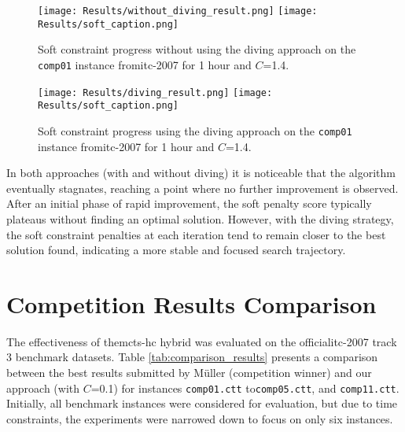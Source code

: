 \begin{figure}
 \centering
    \texttt{[image: Results/without\_diving\_result.png]}
    \texttt{[image: Results/soft\_caption.png]}
    \caption{Soft constraint progress without using the diving approach on the \texttt{comp01} instance from\ac{itc-2007} for 1 hour and \(C\)=1.4.}
    \label{fig:without_diving_result}
\end{figure}

\begin{figure}
 \centering
    \texttt{[image: Results/diving\_result.png]}
    \texttt{[image: Results/soft\_caption.png]}
    \caption{Soft constraint progress using the diving approach on the \texttt{comp01} instance from\ac{itc-2007} for 1 hour and \(C\)=1.4.}
    \label{fig:diving_result}
\end{figure}

In both approaches (with and without diving) it is noticeable that the algorithm eventually stagnates, reaching a point where no further improvement is observed. After an initial phase of rapid improvement, the soft penalty score typically plateaus without finding an optimal solution. However, with the diving strategy, the soft constraint penalties at each iteration tend to remain closer to the best solution found, indicating a more stable and focused search trajectory.

\section{Competition Results Comparison}

The effectiveness of the\ac{mcts}-\ac{hc} hybrid was evaluated on the official\ac{itc-2007} track 3 benchmark datasets. Table \ref{tab:comparison_results} presents a comparison between the best results submitted by Müller (competition winner) and our approach (with \(C\)=0.1) for instances \texttt{comp01.ctt} to\texttt{comp05.ctt}, and \texttt{comp11.ctt}. Initially, all benchmark instances were considered for evaluation, but due to time constraints, the experiments were narrowed down to focus on only six instances.

